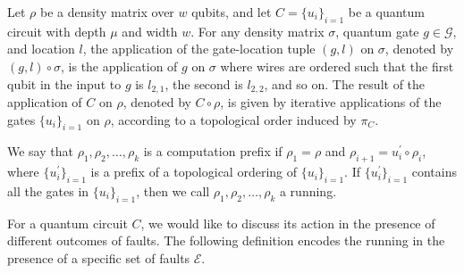 \begin{definition}
  Let $\rho$ be a density matrix over $w$ qubits, and let $C = \{u_{i}\}_{i=1}$ be a quantum circuit with depth $\mu$ and width $w$. For any density matrix $\sigma$, quantum gate $g \in \mathcal{G}$, and location $l$, the application of the gate-location tuple $(g,l)$ on $\sigma$, denoted by $(g,l) \circ \sigma$, is the application of $g$ on $\sigma$ where wires are ordered such that the first qubit in the input to $g$ is $l_{2,1}$, the second is $l_{2,2}$, and so on. The result of the application of $C$ on $\rho$, denoted by $C \circ \rho$, is given by iterative applications of the gates $\{u_{i}\}_{i=1}$ on $\rho$, according to a topological order induced by $\pi_{C}$.

We say that $\rho_{1}, \rho_{2}, \ldots, \rho_{k}$ is a computation prefix if $\rho_{1} = \rho$ and $\rho_{i+1} = u^\prime_{i} \circ \rho_{i}$, where $\{u^{\prime}_{i}\}_{i=1}$ is a prefix of a topological ordering of $\{u_{i}\}_{i=1}$. If $\{u^{\prime}_{i}\}_{i=1}$ contains all the gates in $\{u_{i}\}_{i=1}$, then we call $\rho_{1}, \rho_{2}, \ldots, \rho_{k}$ a running.
\end{definition}
For a quantum circuit $C$, we would like to discuss its action in the presence of different outcomes of faults. The following definition encodes the running in the presence of a specific set of faults $\mathcal{E}$.
